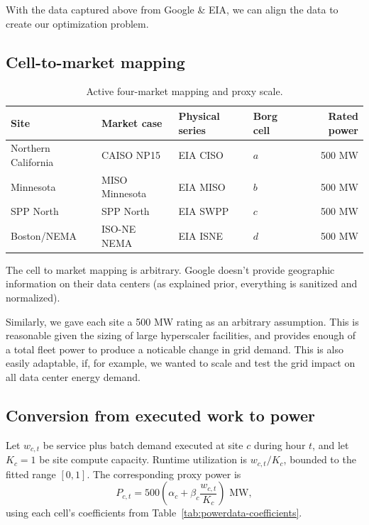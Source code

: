\documentclass[conference]{IEEEtran}
\begin{document}
With the data captured above from Google \& EIA, we can align the data to create our optimization problem. 

\subsection{Cell-to-market mapping}
\label{subsec:transform-mapping}

\begin{table}[t]
  \centering
  \caption{Active four-market mapping and proxy scale.}
  \label{tab:active-market-map}
  \begin{tabular}{@{}llllr@{}}
    \toprule
    Site & Market case & Physical series & Borg cell & Rated power \\
    \midrule
    Northern California & CAISO NP15 & EIA CISO & \(a\) & 500 MW \\
    Minnesota & MISO Minnesota & EIA MISO & \(b\) & 500 MW \\
    SPP North & SPP North & EIA SWPP & \(c\) & 500 MW \\
    Boston/NEMA & ISO-NE NEMA & EIA ISNE & \(d\) & 500 MW \\
    \bottomrule
  \end{tabular}
\end{table}

The cell to market mapping is arbitrary. Google doesn't provide geographic information on their data centers (as explained prior, everything is sanitized and normalized). 

Similarly, we gave each site a 500 MW rating as an arbitrary assumption. This is reasonable given the sizing of large hyperscaler facilities, and provides enough of a total fleet power to produce a noticable change in grid demand. This is also easily adaptable, if, for example, we wanted to scale and test the grid impact on all data center energy demand.

\subsection{Conversion from executed work to power}
\label{subsec:transform-runtime-power}

Let \(w_{c,t}\) be service plus batch demand executed at site \(c\) during hour
\(t\), and let \(K_c=1\) be site compute capacity. Runtime utilization is
\(w_{c,t}/K_c\), bounded to the fitted range \([0,1]\). The corresponding proxy
power is
\begin{equation}
  P_{c,t}
  =
  500
  \left(
    \alpha_c + \beta_c \frac{w_{c,t}}{K_c}
  \right)
  \text{ MW},
  \label{eq:transform-runtime-power}
\end{equation}
using each cell's coefficients from Table~\ref{tab:powerdata-coefficients}. 
\end{document}
